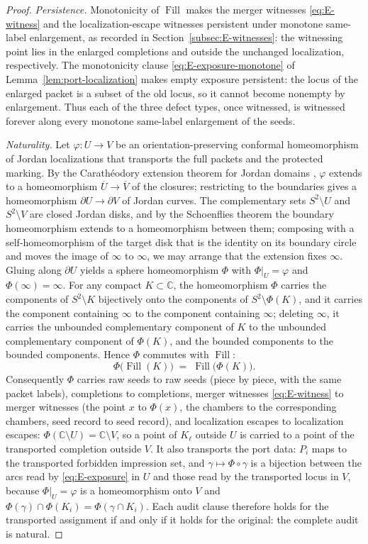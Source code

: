 \documentclass[11pt,reqno]{amsart}
\theoremstyle{definition}
\theoremstyle{remark}
\newcommand{\C}{\mathbb C}
\newcommand{\Fill}{\operatorname{Fill}}
\begin{document}
\begin{proof}
\emph{Persistence.}
Monotonicity of $\Fill$ makes the merger witnesses \eqref{eq:E-witness} and the
localization-escape witnesses persistent under monotone same-label enlargement, as
recorded in Section~\ref{subsec:E-witnesses}: the witnessing point lies in the
enlarged completions and outside the unchanged localization, respectively. The
monotonicity clause \eqref{eq:E-exposure-monotone} of
Lemma~\ref{lem:port-localization} makes empty exposure persistent: the locus of the
enlarged packet is a subset of the old locus, so it cannot become nonempty by
enlargement. Thus each of the three defect types, once witnessed, is witnessed
forever along every monotone same-label enlargement of the seeds.

\emph{Naturality.}
Let $\varphi\colon U\to V$ be an orientation-preserving conformal homeomorphism of
Jordan localizations that transports the full packets and the protected marking. By
the Carath\'eodory extension theorem for Jordan domains \cite{Pom92}, $\varphi$
extends to a homeomorphism $\overline U\to\overline V$ of the closures; restricting
to the boundaries gives a homeomorphism $\partial U\to\partial V$ of Jordan curves.
The complementary sets $S^2\setminus U$ and $S^2\setminus V$ are closed Jordan disks,
and by the Schoenflies theorem \cite{New51} the boundary homeomorphism extends to a
homeomorphism between them; composing with a self-homeomorphism of the target disk
that is the identity on its boundary circle and moves the image of $\infty$ to
$\infty$, we may arrange that the extension fixes $\infty$. Gluing along
$\partial U$ yields a sphere homeomorphism $\Phi$ with $\Phi|_U=\varphi$ and
$\Phi(\infty)=\infty$. For any compact $K\subset\C$, the homeomorphism $\Phi$ carries
the components of $S^2\setminus K$ bijectively onto the components of
$S^2\setminus\Phi(K)$, and it carries the component containing $\infty$ to the
component containing $\infty$; deleting $\infty$, it carries the unbounded
complementary component of $K$ to the unbounded complementary component of
$\Phi(K)$, and the bounded components to the bounded components. Hence $\Phi$
commutes with $\Fill$:
\[
\Phi\bigl(\Fill(K)\bigr)\;=\;\Fill\bigl(\Phi(K)\bigr).
\]
Consequently $\Phi$ carries raw seeds to raw seeds (piece by piece, with the same
packet labels), completions to completions, merger witnesses
\eqref{eq:E-witness} to merger witnesses (the point $x$ to $\Phi(x)$, the chambers to
the corresponding chambers, seed record to seed record), and localization escapes to
localization escapes: $\Phi(\C\setminus U)=\C\setminus V$, so a point of $K_\ell$
outside $U$ is carried to a point of the transported completion outside $V$. It also transports the port data: $P_i$ maps to
the transported forbidden impression set, and $\gamma\mapsto\Phi\circ\gamma$ is a
bijection between the arcs read by \eqref{eq:E-exposure} in $U$ and those read by the
transported locus in $V$, because $\Phi|_U=\varphi$ is a homeomorphism onto $V$ and
$\Phi(\gamma)\cap\Phi(K_i)=\Phi(\gamma\cap K_i)$. Each audit clause therefore holds
for the transported assignment if and only if it holds for the original: the
complete audit is natural.
\end{proof}
\end{document}

